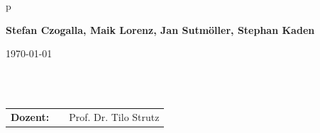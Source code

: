 \begin{center}
\begin{tabular}{p{\textwidth}}
\begin{center}
\large{\textbf{Stefan Czogalla, Maik Lorenz, Jan Sutmöller, Stephan Kaden}} \\
\small{}
\end{center}

\begin{center}
\large{\today}
\end{center}

\\

\\

\begin{center}
\begin{tabular}{lll}
\textbf{Dozent:} & & Prof. Dr. Tilo Strutz\\
\end{tabular}
\end{center}

\end{tabular}
\end{center}